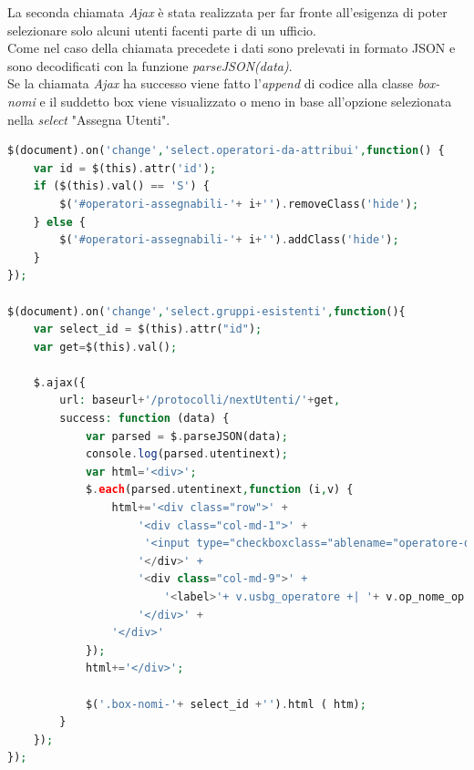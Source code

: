         La seconda chiamata \textit{Ajax} è stata realizzata per far fronte all'esigenza di poter selezionare solo alcuni utenti facenti parte di un ufficio. 
        \\ 
        Come nel caso della chiamata precedete i dati sono prelevati in formato JSON e sono decodificati con la funzione \textit{parseJSON(data)}.
        \\
        Se la chiamata \textit{Ajax} ha successo viene fatto l'\textit{append} di codice alla classe \textit{box-nomi} e il suddetto box viene visualizzato o meno in base all'opzione selezionata nella \textit{select} "Assegna Utenti".
        \begin{lstlisting}[language=PHP, caption= JQuery Nuovi utenti]
$(document).on('change','select.operatori-da-attribui',function() {
    var id = $(this).attr('id');
    if ($(this).val() == 'S') {
        $('#operatori-assegnabili-'+ i+'').removeClass('hide');
    } else {
        $('#operatori-assegnabili-'+ i+'').addClass('hide');
    }
});
            
$(document).on('change','select.gruppi-esistenti',function(){
    var select_id = $(this).attr("id");
    var get=$(this).val();
            
    $.ajax({
        url: baseurl+'/protocolli/nextUtenti/'+get,
        success: function (data) {
            var parsed = $.parseJSON(data);
            console.log(parsed.utentinext);
            var html='<div>';
            $.each(parsed.utentinext,function (i,v) {
                html+='<div class="row">' +
                    '<div class="col-md-1">' +
                     '<input type="checkboxclass="ablename="operatore-da-assegnare[]value=" '+ v.usbg_operatore +'">+
                    '</div>' +
                    '<div class="col-md-9">' +
                        '<label>'+ v.usbg_operatore +| '+ v.op_nome_op +'</label>' +
                    '</div>' +
                '</div>'
            });
            html+='</div>';
            
            $('.box-nomi-'+ select_id +'').html ( htm);
        }
    });
});
        \end{lstlisting}
       

